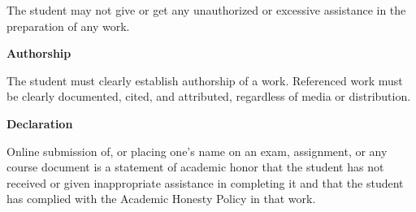 \documentclass[11pt]{article}
\begin{document}
\hspace{3mm}
\hangindent=5mm The student may not give or get any unauthorized or excessive assistance in the preparation of any work.

\textbf{Authorship}

\hspace{3mm}
\hangindent=5mm The student must clearly establish authorship of a work. Referenced work must be clearly documented, cited, and attributed, regardless of media or distribution. 

\textbf{Declaration}

\hspace{3mm}
\hangindent=5mm Online submission of, or placing one's name on an exam, assignment, or any course document is a statement of academic honor that the student has not received or given inappropriate assistance in completing it and that the student has complied with the Academic Honesty Policy in that work.




\end{document}
